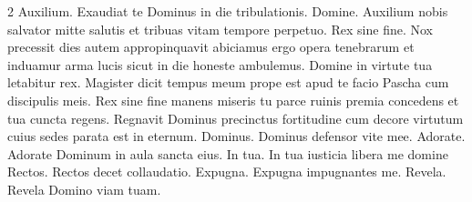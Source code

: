 \begin{multicols*}{2}
 Auxilium.
 Exaudiat te Dominus in die tribulationis.
 Domine.
 Auxilium nobis salvator mitte salutis et tribuas vitam tempore perpetuo.
 Rex sine fine.
 Nox precessit dies autem appropinquavit abiciamus ergo opera tenebrarum et induamur arma lucis sicut in die honeste ambulemus.
 Domine in virtute tua letabitur rex.
 Magister dicit tempus meum prope est apud te facio Pascha cum discipulis meis.
 Rex sine fine manens miseris tu parce ruinis premia concedens et tua cuncta regens.
 Regnavit Dominus precinctus fortitudine cum decore virtutum cuius sedes parata est in eternum.
 Dominus.
 Dominus defensor vite mee.
 Adorate.
 Adorate Dominum in aula sancta eius.
 In tua.
 In tua iusticia libera me domine
 Rectos.
 Rectos decet collaudatio.
 Expugna.
 Expugna impugnantes me.
 Revela.
 Revela Domino viam tuam.

\end{multicols*}
